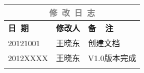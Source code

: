 \begin{center}
\begin{tabular}{p{2cm}|p{2cm}|p{8cm}}
  \hline
  \multicolumn{3}{c}{\textcolor{gray}{\textbf{\large 修~改~日~志}}} \\
  \hline
  \textbf{日~期} & \textbf{修改人} & \textbf{备~~注} \\
  \hline 
  20121001 & 王晓东 & 创建文档 \\
  2012XXXX & 王晓东 & V1.0版本完成 \\

&   &  \\
\hline
\end{tabular}
\end{center}
